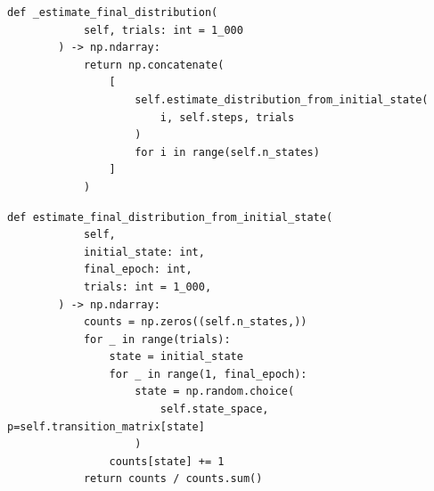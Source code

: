 \documentclass[12pt]{article}
\begin{document}
\begin{lstlisting}[title={En src/simulation.py, después de \_compute\_paths()}]
        def _estimate_final_distribution(
            self, trials: int = 1_000
        ) -> np.ndarray:
            return np.concatenate(
                [
                    self.estimate_distribution_from_initial_state(
                        i, self.steps, trials
                    )
                    for i in range(self.n_states)
                ]
            )
\end{lstlisting}

\begin{lstlisting}[title={En src/simulation.py, después de \_estimate\_final\_distribution()}]
        def estimate_final_distribution_from_initial_state(
            self,
            initial_state: int,
            final_epoch: int,
            trials: int = 1_000,
        ) -> np.ndarray:
            counts = np.zeros((self.n_states,))
            for _ in range(trials):
                state = initial_state
                for _ in range(1, final_epoch):
                    state = np.random.choice(
                        self.state_space, p=self.transition_matrix[state]
                    )
                counts[state] += 1
            return counts / counts.sum()
\end{lstlisting}
\end{document}
